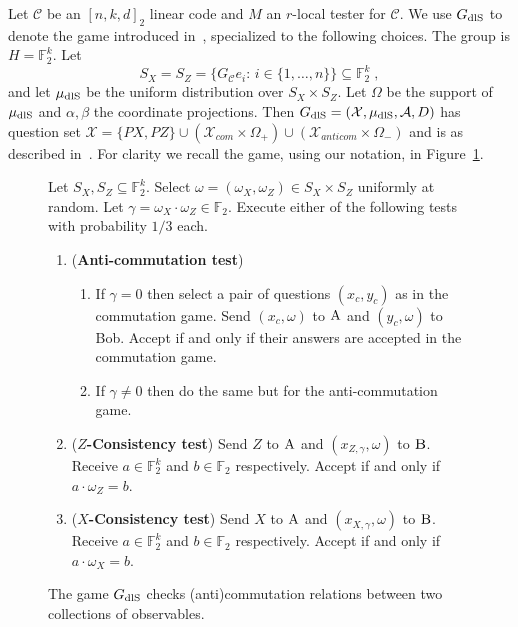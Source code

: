 \documentclass[11pt]{article}
\theoremstyle{definition}
\newcommand{\code}{\mathcal{C}}
\newcommand{\field}{\mathbb{F}_2}
\newcommand{\dlS}{\ensuremath{\rm dlS}}
\newcommand{\mA}{\ensuremath{\mathcal{A}}}
\newcommand{\mX}{\ensuremath{\mathcal{X}}}
\newcommand{\labelstyle}[1]{\ensuremath{\textsc{#1}}\xspace}
\newcommand{\alice}{\labelstyle{A}}
\newcommand{\bob}{\labelstyle{B}}
\newenvironment{gamespec}{
  \begin{mdframed}[style=figstyle]}{
  \end{mdframed}}
\begin{document}
Let $\code$ be an $[n,k,d]_2$ linear code and $M$ an $r$-local tester for $\code$. 
We use $G_{\dlS}$ to denote the game introduced in~\cite[Section 3.4]{de2022spectral}, specialized to the following choices. The group is $H=\field^k$. Let
\[ S_X=S_Z=\{G_\code e_i:\,i\in\{1,\ldots,n\}\}\subseteq \field^k\;,\]
and let $\mu_{\dlS}$ be the uniform distribution over $S_X\times S_Z$. Let $\Omega$ be the support of $\mu_{\dlS}$ and $\alpha,\beta$ the coordinate projections. Then $G_{\dlS}=(\mX,\mu_{\dlS},\mA,D)$ has question set $\mX = \{PX,PZ\} \cup (\mX_{com}\times \Omega_+) \cup (\mX_{anticom} \times \Omega_-)$ and is as described in~\cite[Section 3.4]{de2022spectral}. For clarity we recall the game, using our notation, in Figure~\ref{fig:dlS}. 

\begin{figure}[!htbp]
  \centering
  \begin{gamespec}
Let $S_X,S_Z\subseteq \field^k$.  Select $\omega = (\omega_X,\omega_Z)\in S_X \times S_Z $ uniformly at random. Let $\gamma = \omega_X \cdot \omega_Z \in \field$. Execute either of the following tests with probability $1/3$ each. 
    \begin{enumerate}
      \setlength\itemsep{1pt}
    \item (\textbf{Anti-commutation test}) 
		\begin{enumerate}
		\item If $\gamma=0$ then select a pair of questions $(x_c,y_c)$ as in the commutation game. Send $(x_c,\omega)$ to $\alice$ and $(y_c,\omega)$ to Bob. Accept if and only if their answers are accepted in the commutation game. 
		\item If $\gamma\neq 0$ then do the same but for the anti-commutation game. 
		\end{enumerate} 
		 \item (\textbf{$Z$-Consistency test}) Send $Z$ to $\alice$ and $(x_{Z,\gamma},\omega)$ to $\bob$. Receive $a\in \field^k$ and $b\in \field$ respectively. Accept if and only if $a\cdot \omega_Z=b$. 
		 \item (\textbf{$X$-Consistency test}) Send $X$ to $\alice$ and $(x_{X,\gamma},\omega)$ to $\bob$. Receive $a\in \field^k$ and $b\in \field$ respectively. Accept if and only if $a\cdot \omega_X=b$. 
    \end{enumerate}
  \end{gamespec}
  \caption{The game $G_{\dlS}$ checks (anti)commutation relations between two collections of observables.}
  \label{fig:dlS}
\end{figure}
\end{document}
